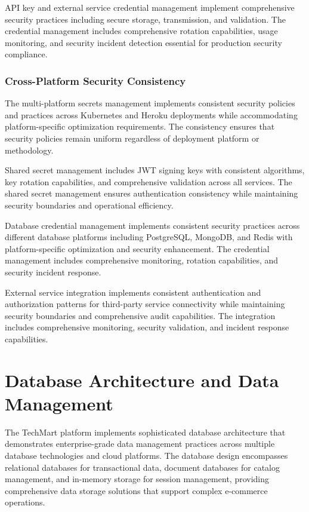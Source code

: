 API key and external service credential management implement comprehensive security practices including secure storage, transmission, and validation. The credential management includes comprehensive rotation capabilities, usage monitoring, and security incident detection essential for production security compliance.

\subsubsection{Cross-Platform Security Consistency}

The multi-platform secrets management implements consistent security policies and practices across Kubernetes and Heroku deployments while accommodating platform-specific optimization requirements. The consistency ensures that security policies remain uniform regardless of deployment platform or methodology.

Shared secret management includes JWT signing keys with consistent algorithms, key rotation capabilities, and comprehensive validation across all services. The shared secret management ensures authentication consistency while maintaining security boundaries and operational efficiency.

Database credential management implements consistent security practices across different database platforms including PostgreSQL, MongoDB, and Redis with platform-specific optimization and security enhancement. The credential management includes comprehensive monitoring, rotation capabilities, and security incident response.

External service integration implements consistent authentication and authorization patterns for third-party service connectivity while maintaining security boundaries and comprehensive audit capabilities. The integration includes comprehensive monitoring, security validation, and incident response capabilities.

\section{Database Architecture and Data Management}

The TechMart platform implements sophisticated database architecture that demonstrates enterprise-grade data management practices across multiple database technologies and cloud platforms. The database design encompasses relational databases for transactional data, document databases for catalog management, and in-memory storage for session management, providing comprehensive data storage solutions that support complex e-commerce operations.

